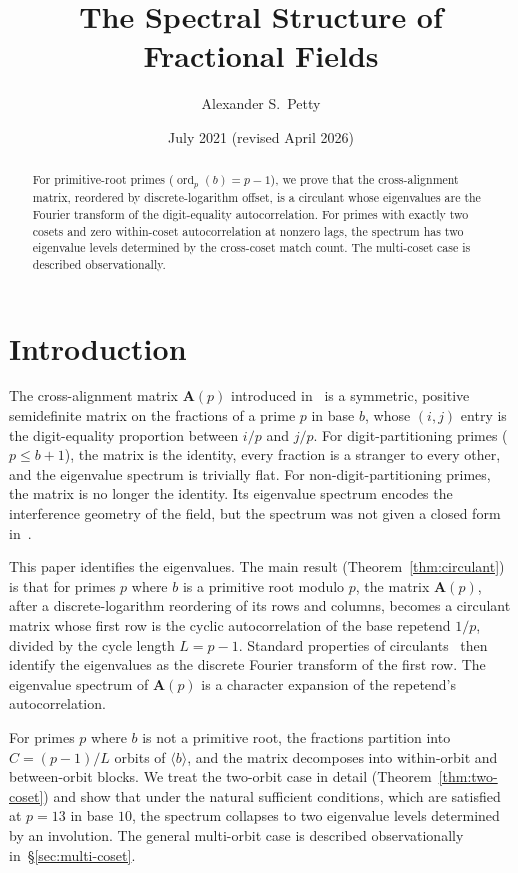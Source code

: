 \documentclass[12pt]{amsart}
\title{The Spectral Structure of Fractional Fields}
\author{Alexander S.\ Petty}
\date{July 2021 (revised April 2026)}
\theoremstyle{definition}
\theoremstyle{remark}
\begin{document}
\begin{abstract}
For primitive-root primes ($\operatorname{ord}_p(b) = p{-}1$),
we prove that the cross-alignment matrix, reordered by
discrete-logarithm offset, is a circulant whose eigenvalues
are the Fourier transform of the digit-equality
autocorrelation. For primes with exactly two cosets and
zero within-coset autocorrelation at nonzero lags, the
spectrum has two eigenvalue levels determined by the
cross-coset match count. The multi-coset case is described
observationally.
\end{abstract}
\maketitle

\section{Introduction}

The cross-alignment matrix $\mathbf{A}(p)$ introduced
in~\cite{paper6} is a symmetric, positive semidefinite
matrix on the fractions of a prime $p$ in base $b$, whose
$(i,j)$ entry is the digit-equality proportion between
$i/p$ and $j/p$. For digit-partitioning primes
($p \le b{+}1$), the matrix is the identity, every
fraction is a stranger to every other, and the eigenvalue
spectrum is trivially flat. For non-digit-partitioning
primes, the matrix is no longer the identity. Its
eigenvalue spectrum encodes the interference geometry of
the field, but the spectrum was not given a closed form
in~\cite{paper6}.

This paper identifies the eigenvalues. The main result
(Theorem~\ref{thm:circulant}) is that for primes $p$
where $b$ is a primitive root modulo $p$, the matrix
$\mathbf{A}(p)$, after a discrete-logarithm reordering of
its rows and columns, becomes a circulant matrix whose
first row is the cyclic autocorrelation of the base
repetend $1/p$, divided by the cycle length $L = p - 1$.
Standard properties of circulants~\cite{davis} then
identify the eigenvalues as the discrete Fourier
transform of the first row. The eigenvalue spectrum of
$\mathbf{A}(p)$ is a character expansion of the
repetend's autocorrelation.

For primes $p$ where $b$ is not a primitive root, the
fractions partition into $C = (p{-}1)/L$ orbits of
$\langle b \rangle$, and the matrix decomposes into
within-orbit and between-orbit blocks. We treat the
two-orbit case in detail (Theorem~\ref{thm:two-coset})
and show that under the natural sufficient conditions,
which are satisfied at $p = 13$ in base $10$, the
spectrum collapses to two eigenvalue levels determined
by an involution. The general multi-orbit case is
described observationally in~\S\ref{sec:multi-coset}.
\end{document}
